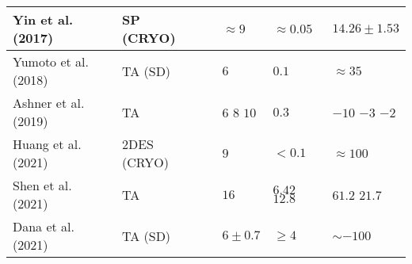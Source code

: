 \documentclass[journal=nalefd, manuscript=letter, layout=twocolumn]{achemso}
\begin{document}
\begin{table*}[t]
\begin{tabular}{ M{0.15\textwidth} M{0.15\textwidth} M{0.14\textwidth} M{0.12\textwidth} M{0.1\textwidth} M{0.12\textwidth} }
Yin et al. (2017)\cite{Yin2017} & %
SP (CRYO) & %
 & %
$\approx 9$ & %
$\approx 0.05$ & %
$14.26 \pm 1.53$ \\ %
\midrule

Yumoto et al. (2018) \cite{Yumoto2018} & %
TA (SD) & %
 & %
$6$ & %
$0.1$ & %
$\approx 35$ \\ %
\midrule

Ashner et al. (2019) \cite{Ashner2019} & %
TA & %
 & %
 & %
$0.3$ & %
 \\ %


\midrule

Huang et al. (2021) \cite{Huang2020} & %
2DES (CRYO) & %
 & %
$9$ & %
$< 0.1$ & %
$\approx 100$ \\ %
\midrule

Shen et al. (2021) \cite{Shen2021} & %
TA & %
 & %
$16$ & %
 & %
 \\ %
\midrule

Dana et al. (2021) \cite{Dana2021} & %
TA (SD) & %
 & %
$6 \pm 0.7 $ & %
$\ge 4$ & %
$\sim -100$ \\ %
\midrule


\end{tabular}
\end{table*}
\end{document}

